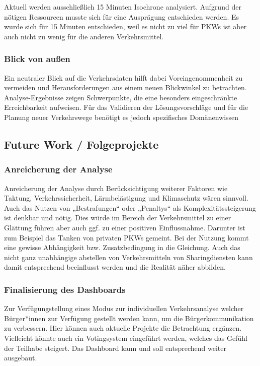 Aktuell werden ausschließlich 15 Minuten Isochrone analysiert​. Aufgrund der nötigen Ressourcen musste sich für eine Ausprägung entschieden werden.
Es wurde sich für 15 Minuten entschieden, weil es nicht zu viel für PKWs ist aber auch nicht zu wenig für die anderen Verkehrsmittel.

\subsubsection{Blick von außen}
Ein neutraler Blick auf die Verkehrsdaten hilft dabei Voreingenommenheit zu vermeiden und Herausforderungen aus einem neuen Blickwinkel zu betrachten.​
Analyse-Ergebnisse zeigen Schwerpunkte, die eine besonders eingeschränkte Erreichbarkeit aufweisen. Für das Validieren der Lösungsvorschläge und für die Planung neuer Verkehrswege benötigt es jedoch spezifisches Domänenwissen​

\subsection{Future Work / Folgeprojekte}

\subsubsection{Anreicherung der Analyse}
Anreicherung der Analyse durch Berücksichtigung weiterer Faktoren wie Taktung, Verkehrssicherheit, Lärmbelästigung und Klimaschutz wären sinnvoll.
Auch das Nutzen von „Bestrafungen“ oder „Penaltys“ als Komplexitätssteigerung ist denkbar und nötig. Dies würde im Bereich der Verkehrsmittel zu einer Glättung führen aber auch ggf. zu einer positiven Einflussnahme.
Darunter ist zum Beispiel das Tanken von privaten PKWs gemeint. Bei der Nutzung kommt eine gewisse Abhängigkeit bzw. Zusatzbedingung in die Gleichung.
Auch das nicht ganz unabhängige abstellen von Verkehrsmitteln von Sharingdiensten kann damit entsprechend beeinflusst werden und die Realität näher abbilden.


\subsubsection{Finalisierung des Dashboards}
Zur Verfügungstellung eines Modus zur individuellen Verkehrsanalyse welcher Bürger*innen zur Verfügung gestellt werden kann, um die Bürgerkommunikation zu verbessern.
Hier können auch aktuelle Projekte die Betrachtung ergänzen. Vielleicht könnte auch ein Votingsystem eingeführt werden, welches das Gefühl der Teilhabe steigert.
Das Dashboard kann und soll entsprechend weiter ausgebaut. 

